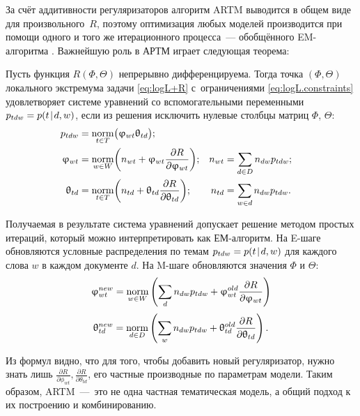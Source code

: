 За счёт аддитивности регуляризаторов алгоритм ARTM  выводится в общем виде для произвольного~$R$, поэтому оптимизация любых моделей  производится при помощи одного и того же итерационного процесса~--- обобщённого EM-алгоритма  \cite{vorontsov2014additive,voron15mlj}. Важнейшую роль в АРТМ играет следующая теорема:
\begin{Theorem}
\label{th:ARTM}
    Пусть функция $R(\Phi,\Theta)$ непрерывно дифференцируема.
    Тогда точка $(\Phi,\Theta)$ локального экстремума задачи
    \eqref{eq:logL+R} с~ограничениями \eqref{eq:logL.constraints}
    удовлетворяет системе уравнений со вспомогательными переменными $p_{tdw}=p(t\mspace{2mu}{|}\mspace{2mu} d,w)$,
    если из решения исключить нулевые столбцы матриц $\Phi$, $\Theta$:
    \begin{align}
    \label{eq:ARTM.Estep}
        p_{tdw} &=\mathop{\mathrm{norm}}\limits_{t\in T} \bigl( \upvarphi_{wt}\uptheta_{td} \bigr);
    \\\label{eq:ARTM.Mstep.phi}
        \upvarphi_{wt} &=\mathop{\mathrm{norm}}\limits_{w\in W}
            \biggl(
                n_{wt} + \upvarphi_{wt} \frac{\partial R}{\partial \upvarphi_{wt}}
            \biggr);
        &
        n_{wt} &= \sum_{d\in D} n_{dw}p_{tdw};&
    \\\label{eq:ARTM.Mstep.theta}
        \uptheta_{td} &=\mathop{\mathrm{norm}}\limits_{t\in T}
            \biggl(
                n_{td} + \uptheta_{td} \frac{\partial R}{\partial \uptheta_{td}}
            \biggr);
        &
        n_{td} &= \sum_{w\in d} n_{dw}p_{tdw}.&
    \end{align}
\end{Theorem}

Получаемая в результате система уравнений допускает решение методом простых итераций, который можно интерпретировать как ЕМ-алгоритм. На E-шаге обновляются условные распределения по темам $p_{tdw}=p(t\mspace{2mu}{|}\mspace{2mu} d,w)$ для каждого слова $w$ в каждом документе $d$. На M-шаге обновляются значения $\Phi$ и $\Theta$:
\begin{equation} \label{eq:Mstep_Theta}
\upvarphi_{wt}^{new} =\mathop{\mathrm{norm}}\limits_{w\in W} \left( \sum_{d} n_{dw} p_{tdw} + \upvarphi_{wt}^{old} \frac{\partial{R}}{\partial{\ensuremath{\upvarphi}_{wt}}}\right)
\end{equation}
\[
\uptheta_{td}^{new}   =\mathop{\mathrm{norm}}\limits_{d\in D} \left( \sum_{w} n_{dw} p_{tdw} + \uptheta_{td}^{old} \frac{\partial{R}}{\partial{\uptheta_{td}}}\right).
\]

Из формул видно, что для того, чтобы добавить новый регуляризатор, нужно знать лишь $\frac{\partial{R}}{\partial{\phi_{wt}}}, \frac{\partial{R}}{\partial{\theta_{td}}}$, его частные производные по параметрам модели. Таким образом, ARTM~---~это не одна частная тематическая модель, а общий подход к их построению и комбинированию.

